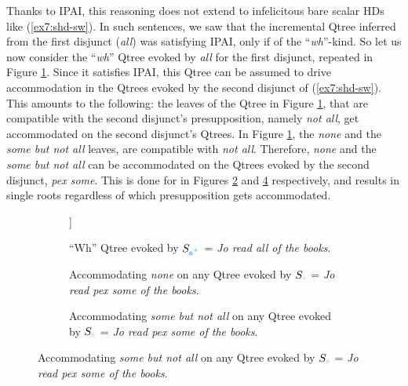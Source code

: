 Thanks to IPAI, this reasoning does not extend to infelicitous bare scalar HDs like (\ref{ex7:shd-sw}). In such sentences, we saw that the incremental Qtree inferred from the first disjunct (\textit{all}) was satisfying IPAI, only if of the ``\textit{wh}''-kind. So let us now consider the ``\textit{wh}'' Qtree evoked by \textit{all} for the first disjunct, repeated in Figure \ref{fig7:qtree-all-wh-rr}. Since it satisfies IPAI, this Qtree can be assumed to drive accommodation in the Qtrees evoked by the second disjunct of (\ref{ex7:shd-sw}). This amounts to the following: the leaves of the Qtree in Figure \ref{fig7:qtree-all-wh-rr}, that are compatible with the second disjunct's presupposition, namely \textit{not all}, get accommodated on the second disjunct's Qtrees. In Figure \ref{fig7:qtree-all-wh-rr}, the \textit{none} and the \textit{some but not all} leaves, are compatible with \textit{not all}. Therefore, \textit{none} and the \textit{some but not all} can be accommodated on the Qtrees evoked by the second disjunct, \textit{pex some}. This is done for in Figures \ref{fig7:qtree-psome-inter-none} and \ref{fig7:qtree-psome-inter-sbna} respectively, and results in single roots regardless of which presupposition gets accommodated.


\begin{figure}[H]
	\begin{subfigure}[b]{.3\linewidth}
		\centering
		\begin{forest}
			[CS[$\neg\exists$][$\exists\wedge\neg\forall$][\fbox{$\forall$}]]
		\end{forest}
		\caption[]{``Wh'' Qtree evoked by $S_{\textbf{\textcolor{cyan}{s$^+$}}}$ = \textit{Jo read all of the books}.}\label{fig7:qtree-all-wh-rr}
	\end{subfigure}
	\hfill
	\begin{subfigure}[b]{.3\linewidth}
		\centering
		\begin{forest}
		\end{forest}
		\caption[]{Accommodating \textit{none} on any Qtree evoked by $S_{\s}$ = \textit{Jo read pex some of the books}.}\label{fig7:qtree-psome-inter-none}
	\end{subfigure}
	\begin{subfigure}[b]{.3\linewidth}
		\centering
		\begin{forest}
		\end{forest}
		\caption[]{Accommodating \textit{some but not all} on any Qtree evoked by $S_{\s}$ = \textit{Jo read pex some of the books}.}\label{fig7:qtree-psome-inter-sbna}
	\end{subfigure}
\end{figure}

